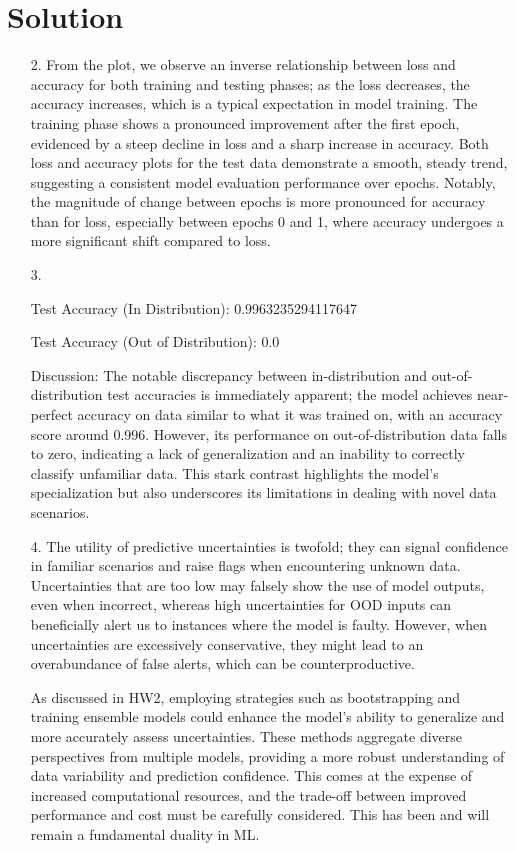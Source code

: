 \documentclass[submit]{harvardml}
\newenvironment{answer}
  {\section*{Solution}}
{}
\begin{document}
\begin{answer}
\begin{enumerate}
    \item[2.] From the plot, we observe an inverse relationship between loss and accuracy for both training and testing phases; as the loss decreases, the accuracy increases, which is a typical expectation in model training. The training phase shows a pronounced improvement after the first epoch, evidenced by a steep decline in loss and a sharp increase in accuracy. Both loss and accuracy plots for the test data demonstrate a smooth, steady trend, suggesting a consistent model evaluation performance over epochs. Notably, the magnitude of change between epochs is more pronounced for accuracy than for loss, especially between epochs 0 and 1, where accuracy undergoes a more significant shift compared to loss.

    \item[3.] 

      Test Accuracy (In Distribution): 0.9963235294117647

      Test Accuracy (Out of Distribution): 0.0 

      Discussion: The notable discrepancy between in-distribution and out-of-distribution test accuracies is immediately apparent; the model achieves near-perfect accuracy on data similar to what it was trained on, with an accuracy score around 0.996. However, its performance on out-of-distribution data falls to zero, indicating a lack of generalization and an inability to correctly classify unfamiliar data. This stark contrast highlights the model's specialization but also underscores its limitations in dealing with novel data scenarios.

    \item[4.] The utility of predictive uncertainties is twofold; they can signal confidence in familiar scenarios and raise flags when encountering unknown data. Uncertainties that are too low may falsely show the use of model outputs, even when incorrect, whereas high uncertainties for OOD inputs can beneficially alert us to instances where the model is faulty. However, when uncertainties are excessively conservative, they might lead to an overabundance of false alerts, which can be counterproductive.
    
    As discussed in HW2, employing strategies such as bootstrapping and training ensemble models could enhance the model's ability to generalize and more accurately assess uncertainties. These methods aggregate diverse perspectives from multiple models, providing a more robust understanding of data variability and prediction confidence. This comes at the expense of increased computational resources, and the trade-off between improved performance and cost must be carefully considered. This has been and will remain a fundamental duality in ML. 


\end{enumerate}
\end{answer}
\end{document}
